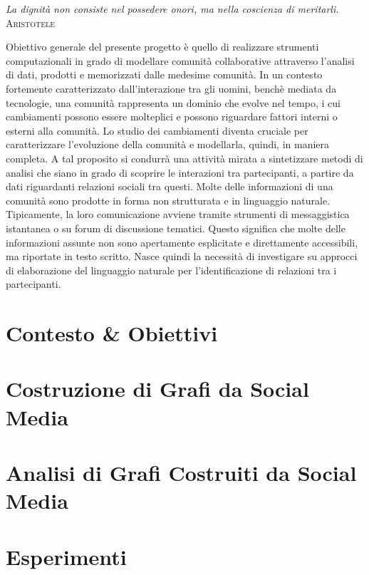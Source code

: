 \documentclass[a4paper,12pt]{toptesi}
\theoremstyle{definition}
\begin{document}
\frontespizio

\begin{citazioni}
	\textit{La dignit{\`a} non consiste nel possedere onori, ma nella coscienza di meritarli. \\}
    \textsc{Aristotele}
\end{citazioni}

\sommario
Obiettivo generale del presente progetto {\`e} quello di realizzare strumenti computazionali in grado di modellare comunit{\`a} collaborative attraverso l'analisi di dati, prodotti e memorizzati dalle medesime comunit{\`a}. In un contesto fortemente caratterizzato dall'interazione tra gli uomini, bench{\`e} mediata da tecnologie, una comunit{\`a} rappresenta un dominio che evolve nel tempo, i cui cambiamenti possono essere molteplici e possono riguardare fattori interni o esterni alla comunit{\`a}. Lo studio dei cambiamenti diventa cruciale per caratterizzare l'evoluzione della comunit{\`a} e modellarla, quindi, in maniera completa. A tal proposito si condurr{\`a} una attivit{\`a} mirata a sintetizzare metodi di analisi che siano in grado di scoprire le interazioni tra partecipanti, a partire da dati riguardanti relazioni sociali tra questi. Molte delle informazioni di una comunit{\`a} sono prodotte in forma non strutturata e  in linguaggio naturale. Tipicamente, la loro comunicazione avviene tramite strumenti di messaggistica istantanea o su forum di discussione tematici. Questo significa che molte delle informazioni assunte non sono apertamente esplicitate e direttamente accessibili, ma riportate in testo scritto. Nasce quindi la necessit{\`a} di investigare su approcci di elaborazione del linguaggio naturale per l'identificazione di relazioni tra i partecipanti.

\figurespagetrue
\indici

\renewcommand\lstlistlistingname{Elenco dei Listati}
\lstlistoflistings

\part{Contesto \& Obiettivi}



\part{Costruzione di Grafi da Social Media}



\part{Analisi di Grafi Costruiti da Social Media}



\part{Esperimenti}

% 


\end{document}
